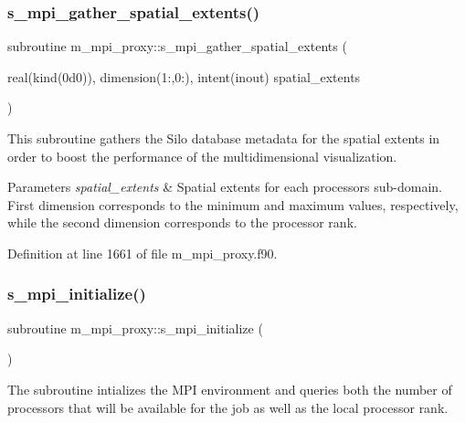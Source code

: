 \subsubsection{\texorpdfstring{s\+\_\+mpi\+\_\+gather\+\_\+spatial\+\_\+extents()}{s\_mpi\_gather\_spatial\_extents()}}
{\footnotesize\ttfamily subroutine m\+\_\+mpi\+\_\+proxy\+::s\+\_\+mpi\+\_\+gather\+\_\+spatial\+\_\+extents (\begin{DoxyParamCaption}\item[{real(kind(0d0)), dimension(1\+:,0\+:), intent(inout)}]{spatial\+\_\+extents }\end{DoxyParamCaption})}



This subroutine gathers the Silo database metadata for the spatial extents in order to boost the performance of the multidimensional visualization. 


\begin{DoxyParams}{Parameters}
{\em spatial\+\_\+extents} & Spatial extents for each processor\textquotesingle{}s sub-\/domain. First dimension corresponds to the minimum and maximum values, respectively, while the second dimension corresponds to the processor rank. \\
\hline
\end{DoxyParams}


Definition at line 1661 of file m\+\_\+mpi\+\_\+proxy.\+f90.

\mbox{\label{namespacem__mpi__proxy_a9bc4c617505152d3cc553e5bc25c1ee1}} 
\subsubsection{\texorpdfstring{s\+\_\+mpi\+\_\+initialize()}{s\_mpi\_initialize()}}
{\footnotesize\ttfamily subroutine m\+\_\+mpi\+\_\+proxy\+::s\+\_\+mpi\+\_\+initialize (\begin{DoxyParamCaption}{ }\end{DoxyParamCaption})}



The subroutine intializes the M\+PI environment and queries both the number of processors that will be available for the job as well as the local processor rank. 



